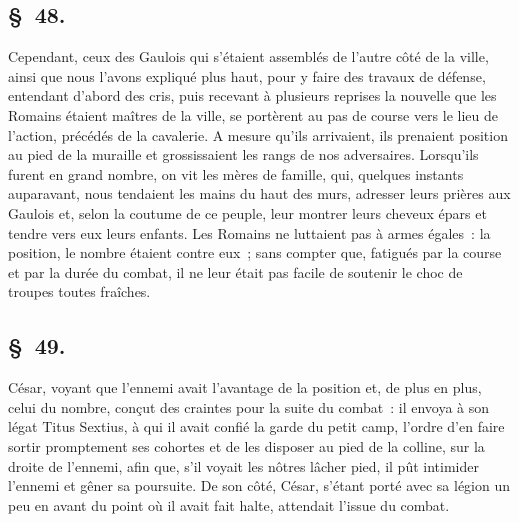 \documentclass[french,twoside]{book} %
\begin{document}
\subsection[{§ 48.}]{ \textsc{§ 48.} }
\noindent Cependant, ceux des Gaulois qui s’étaient assemblés de l’autre côté de la ville, ainsi que nous l’avons expliqué plus haut, pour y faire des travaux de défense, entendant d’abord des cris, puis recevant à plusieurs reprises la nouvelle que les Romains étaient maîtres de la ville, se portèrent au pas de course vers le lieu de l’action, précédés de la cavalerie. A mesure qu’ils arrivaient, ils prenaient position au pied de la muraille et grossissaient les rangs de nos adversaires. Lorsqu’ils furent en grand nombre, on vit les mères de famille, qui, quelques instants auparavant, nous tendaient les mains du haut des murs, adresser leurs prières aux Gaulois et, selon la coutume de ce peuple, leur montrer leurs cheveux épars et tendre vers eux leurs enfants. Les Romains ne luttaient pas à armes égales : la position, le nombre étaient contre eux ; sans compter que, fatigués par la course et par la durée du combat, il ne leur était pas facile de soutenir le choc de troupes toutes fraîches.
\subsection[{§ 49.}]{ \textsc{§ 49.} }
\noindent César, voyant que l’ennemi avait l’avantage de la position et, de plus en plus, celui du nombre, conçut des craintes pour la suite du combat : il envoya à son légat Titus Sextius, à qui il avait confié la garde du petit camp, l’ordre d’en faire sortir promptement ses cohortes et de les disposer au pied de la colline, sur la droite de l’ennemi, afin que, s’il voyait les nôtres lâcher pied, il pût intimider l’ennemi et gêner sa poursuite. De son côté, César, s’étant porté avec sa légion un peu en avant du point où il avait fait halte, attendait l’issue du combat.
\end{document}
